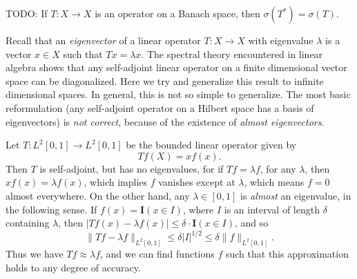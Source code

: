 TODO: If $T: X \to X$ is an operator on a Banach space, then $\sigma(T^*) = \sigma(T)$.

Recall that an \emph{eigenvector} of a linear operator $T: X \to X$ with eigenvalue $\lambda$ is a vector $x \in X$ such that $Tx = \lambda x$. The spectral theory encountered in linear algebra shows that any self-adjoint linear operator on a finite dimensional vector space can be diagonalized. Here we try and generalize this result to infinite dimensional spaces. In general, this is not so simple to generalize. The most basic reformulation (any self-adjoint operator on a Hilbert space has a basis of eigenvectors) is \emph{not correct}, because of the existence of \emph{almost eigenvectors}.

\begin{example}
    Let $T: L^2[0,1] \to L^2[0,1]$ be the bounded linear operator given by
    \[ Tf(X) = x f(x). \]
    Then $T$ is self-adjoint, but has no eigenvalues, for if $Tf = \lambda f$, for any $\lambda$, then $x f(x) = \lambda f(x)$, which implies $f$ vanishes except at $\lambda$, which means $f = 0$ almost everywhere. On the other hand, any $\lambda \in [0,1]$ is \emph{almost} an eigenvalue, in the following sense. If $f(x) = \mathbf{I}(x \in I)$, where $I$ is an interval of length $\delta$ containing $\lambda$, then $|Tf(x) - \lambda f(x)| \leq \delta \cdot \mathbf{I}(x \in I)$, and so
    \[ \| Tf - \lambda f \|_{L^2[0,1]} \leq \delta |I|^{1/2} \leq \delta \| f \|_{L^2[0,1]}. \]
    Thus we have $Tf \approx \lambda f$, and we can find functions $f$ such that this approximation holds to any degree of accuracy.
\end{example}


